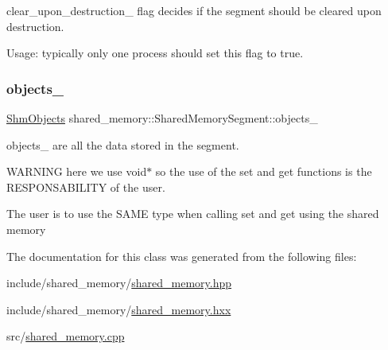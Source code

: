 clear\+\_\+upon\+\_\+destruction\+\_\+ flag decides if the segment should be cleared upon destruction. 

Usage\+: typically only one process should set this flag to true. \mbox{\label{classshared__memory_1_1SharedMemorySegment_a8c4d0eb6f2a620bf7e5b22a57c07380b}} 
\subsubsection{\texorpdfstring{objects\+\_\+}{objects\_}}
{\footnotesize\ttfamily \hyperlink{namespaceshared__memory_ae50b2192256821112a69e47d5314b467}{Shm\+Objects} shared\+\_\+memory\+::\+Shared\+Memory\+Segment\+::objects\+\_\+\hspace{0.3cm}{\ttfamily [private]}}



objects\+\_\+ are all the data stored in the segment. 

W\+A\+R\+N\+I\+NG here we use void$\ast$ so the use of the set and get functions is the R\+E\+S\+P\+O\+N\+S\+A\+B\+I\+L\+I\+TY of the user.

The user is to use the S\+A\+ME type when calling set and get using the shared memory 

The documentation for this class was generated from the following files\+:\begin{DoxyCompactItemize}
\item 
include/shared\+\_\+memory/\hyperlink{shared__memory_8hpp}{shared\+\_\+memory.\+hpp}\item 
include/shared\+\_\+memory/\hyperlink{shared__memory_8hxx}{shared\+\_\+memory.\+hxx}\item 
src/\hyperlink{shared__memory_8cpp}{shared\+\_\+memory.\+cpp}\end{DoxyCompactItemize}
